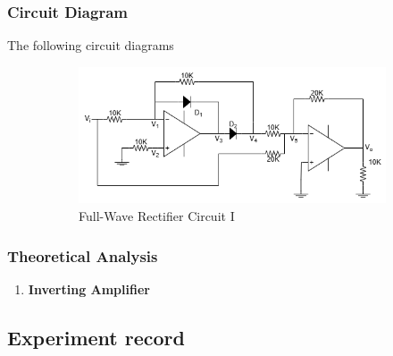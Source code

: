     \subsubsection{Circuit Diagram}
        The following circuit diagrams 
        \begin{figure}[H]
            \centering
            \begin{subfigure}{0.6\textwidth}
                \includegraphics[width=1\linewidth]{Experiment_13/Circuit/Lab13.drawio.png}
                \caption{Full-Wave Rectifier Circuit I}
                \label{cir:13}
            \end{subfigure}
            \caption{}
        \end{figure}

    \subsubsection{Theoretical Analysis}
        \begin{enumerate}[a]
            \item \textbf{Inverting Amplifier}
        \end{enumerate}

\subsection{Experiment record}
